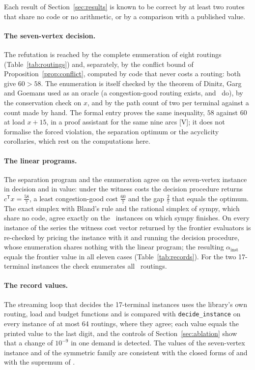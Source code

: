 \documentclass[11pt]{article}
\theoremstyle{remark}
\begin{document}
Each result of Section~\ref{sec:results} is known to be correct by at least two routes that share no code or no arithmetic, or by a comparison with a published value.

\paragraph{The seven-vertex decision.} The refutation is reached by the complete enumeration of eight routings (Table~\ref{tab:routings}) and, separately, by the conflict bound of Proposition~\ref{prop:conflict}, computed by code that never costs a routing: both give $60>58$.
The enumeration is itself checked by the theorem of Dinitz, Garg and Goemans used as an oracle (a congestion-good routing exists, and \ngood\ do), by the conservation check on $x$, and by the path count of two per terminal against a count made by hand. The formal entry \cite{AFP26} proves the same inequality, $58$ against $60$ at load $x+15$, in a proof assistant for the same nine arcs [V]; it does not formalise the forced violation, the separation optimum or the acyclicity corollaries, which rest on the computations here.

\paragraph{The linear programs.} The separation program and the enumeration agree on the seven-vertex instance in decision and in value: under the witness costs the decision procedure returns $c^{\mathsf T}x=\tfrac{58}{7}$, a least congestion-good cost $\tfrac{60}{7}$ and the gap $\tfrac27$ that equals the optimum. The exact simplex with Bland's rule and the rational simplex of sympy, which share no code, agree exactly on the \nxcheck\ instances on which sympy finishes.
On every instance of the series the witness cost vector returned by the frontier evaluators is re-checked by pricing the instance with it and running the decision procedure, whose enumeration shares nothing with the linear program; the resulting $\alpha_{\mathrm{inst}}$ equals the frontier value in all eleven cases (Table~\ref{tab:records}). For the two 17-terminal instances the check enumerates all \nkroutings\ routings.

\paragraph{The record values.} The streaming loop that decides the 17-terminal instances uses the library's own routing, load and budget functions and is compared with \texttt{decide\_instance} on every instance of at most 64 routings, where they agree; each value equals the printed value to the last digit, and the controls of Section~\ref{sec:ablation} show that a change of $10^{-9}$ in one demand is detected. The values of the seven-vertex instance and of the symmetric family are consistent with the closed
forms of \cite{Muf26} and with the supremum of \cite{Nik1}.
\end{document}
